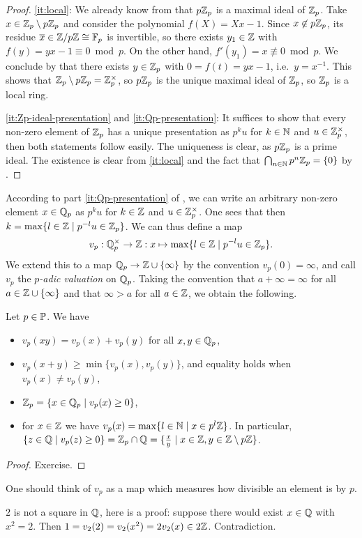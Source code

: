 \documentclass[12pt, leqno, british]{amsart}
\begin{document}
\begin{proof}
\eqref{it:local}: We already know from  that $p\mathbb Z_p$ is a maximal ideal of $\mathbb Z_p$.
Take $x \in \mathbb Z_p \setminus p\mathbb Z_p$ and consider the polynomial $f(X) = Xx - 1$.
Since $x \not\in p\mathbb Z_p$, its residue $\overline{x} \in \mathbb Z/p\mathbb Z \cong \mathbb F_p$ is invertible, so there exists $y_1 \in \mathbb Z$ with $f(y) = yx - 1 \equiv 0 \bmod p$.
On the other hand, $f'(y_1) = x \not\equiv 0 \bmod p$.
We conclude by  that there exists $y \in \mathbb Z_p$ with $0 = f(t) = yx - 1$, i.e.~$y = x^{-1}$.
This shows that $\mathbb Z_p \setminus p\mathbb Z_p = \mathbb Z_p^{\times}$, so $p\mathbb Z_p$ is the unique maximal ideal of $\mathbb Z_p$, so $\mathbb Z_p$ is a local ring.

\eqref{it:Zp-ideal-presentation} and \eqref{it:Qp-presentation}: It suffices to show that every non-zero element of $\mathbb Z_p$ has a unique presentation as $p^k u$ for $k \in \mathbb N$ and $u \in \mathbb Z_p^\times$, then both statements follow easily.
The uniqueness is clear, as $p\mathbb Z_p$ is a prime ideal.
The existence is clear from \eqref{it:local} and the fact that $\bigcap_{n \in \mathbb N} p^n\mathbb Z_p = \lbrace 0 \rbrace$ by .
\end{proof}
According to part \eqref{it:Qp-presentation} of , we can write an arbitrary non-zero element $x \in \mathbb Q_p$ as $p^k u$ for $k \in \mathbb Z$ and $u \in \mathbb Z_p^\times$.
One sees that then $k = \max \lbrace l \in \mathbb Z \mid p^{-l} u \in \mathbb Z_p \rbrace$.
We can thus define a map
$$ v_p : \mathbb Q_p^\times \to \mathbb Z : x \mapsto \max \lbrace l \in \mathbb Z \mid p^{-l} u \in \mathbb Z_p \rbrace. $$
We extend this to a map $\mathbb Q_p \to \mathbb Z \cup \lbrace \infty \rbrace$ by the convention $v_p(0) = \infty$, and call $v_p$ the \emph{$p$-adic valuation} on $\mathbb Q_p$.
Taking the convention that $a + \infty = \infty$ for all $a \in \mathbb Z \cup \lbrace \infty \rbrace$ and that $\infty > a$ for all $a \in \mathbb Z$, we obtain the following.
\begin{prop}\label{P:p-adic-valuation}
Let $p \in \mathbb P$.
We have
\begin{itemize}
\item $v_p(xy) = v_p(x) + v_p(y)$ for all $x, y \in \mathbb Q_p$,
\item $v_p(x + y) \geq \min \lbrace v_p(x), v_p(y) \rbrace$, and equality holds when $v_p(x) \neq v_p(y)$,
\item $\mathbb Z_p = \lbrace x \in \mathbb Q_p \mid v_p(x) \geq 0 \rbrace$,
\item for $x \in \mathbb Z$ we have $v_p(x) = \max \lbrace l \in \mathbb N \mid x \in p^l\mathbb Z \rbrace$.
In particular, $\lbrace z \in \mathbb Q \mid v_p(z) \geq 0 \rbrace = \mathbb Z_p \cap \mathbb Q = \lbrace \frac{x}{y} \mid x \in \mathbb Z, y \in \mathbb Z \setminus p\mathbb Z \rbrace$.
\end{itemize}
\end{prop}
\begin{proof}
Exercise.
\end{proof}
One should think of $v_p$ as a map which measures how divisible an element is by $p$.
\begin{eg}
$2$ is not a square in $\mathbb Q$, here is a proof: suppose there would exist $x \in \mathbb Q$ with $x^2 = 2$.
Then $1 = v_2(2) = v_2(x^2) = 2v_2(x) \in 2\mathbb Z$.
Contradiction.
\end{eg}
\end{document}
